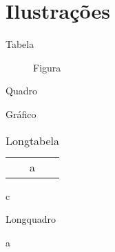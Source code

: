 \section{Ilustrações}

\begin{table}
\caption{Tabela}
\end{table}

\begin{figure}
\caption{Figura}
\end{figure}

\begin{quadro}
\caption{Quadro}
\end{quadro}

\begin{grafico}
\caption{Gráfico}
\end{grafico}

\begin{longtable}{c}
\caption{Longtabela}
\endfirsthead
\endhead
\endfoot
\endlastfoot
a
\end{longtable}

\begin{longquadro}{c}
\caption{Longquadro}
\endfirsthead
\endhead
\endfoot
\endlastfoot
a
\end{longquadro}

\begin{lstlisting}[caption = código]

\end{lstlisting}